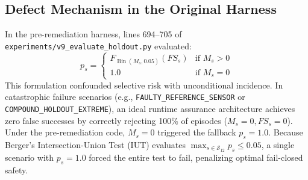 \documentclass[10pt,a4paper]{article}
\begin{document}
\subsection{Defect Mechanism in the Original Harness}
In the pre-remediation harness, lines 694--705 of \texttt{experiments/v9\_evaluate\_holdout.py} evaluated:
\begin{equation}
p_s = \begin{cases}
F_{\operatorname{Bin}(M_s, 0.05)}(FS_s) & \text{if } M_s > 0 \\
1.0 & \text{if } M_s = 0
\end{cases}
\end{equation}
This formulation confounded selective risk with unconditional incidence. In catastrophic failure scenarios (e.g., \texttt{FAULTY\_REFERENCE\_SENSOR} or \texttt{COMPOUND\_HOLDOUT\_EXTREME}), an ideal runtime assurance architecture achieves zero false successes by correctly rejecting 100\% of episodes ($M_s = 0, FS_s = 0$). Under the pre-remediation code, $M_s = 0$ triggered the fallback $p_s = 1.0$. Because Berger's Intersection-Union Test (IUT) evaluates $\max_{s \in \mathcal{S}_{12}} p_s \le 0.05$, a single scenario with $p_s = 1.0$ forced the entire test to fail, penalizing optimal fail-closed safety.
\end{document}
